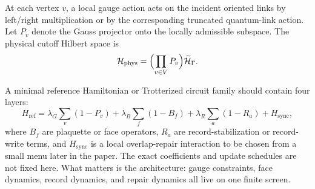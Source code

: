 \documentclass[11pt]{article}
\begin{document}
At each vertex $v$, a local gauge action acts on the incident oriented links by left/right
multiplication or by the corresponding truncated quantum-link action. Let $P_v$ denote the
Gauss projector onto the locally admissible subspace. The physical cutoff Hilbert space is
\begin{equation}
\mathcal H_{\mathrm{phys}} = \Bigl(\prod_{v\in V}P_v\Bigr)\widetilde{\mathcal H}_{\Gamma}.
\end{equation}

A minimal reference Hamiltonian or Trotterized circuit family should contain four layers:
\begin{equation}
H_{\mathrm{ref}} =
\lambda_G\sum_{v}(1-P_v)
+\lambda_B\sum_{f}(1-B_f)
+\lambda_R\sum_{a}(1-R_a)
+H_{\mathrm{sync}},
\end{equation}
where $B_f$ are plaquette or face operators, $R_a$ are record-stabilization or record-write
terms, and $H_{\mathrm{sync}}$ is a local overlap-repair interaction to be chosen from a small
menu later in the paper. The exact coefficients and update schedules are not fixed here.
What matters is the architecture: gauge constraints, face dynamics, record dynamics, and
repair dynamics all live on one finite screen.
\end{document}
